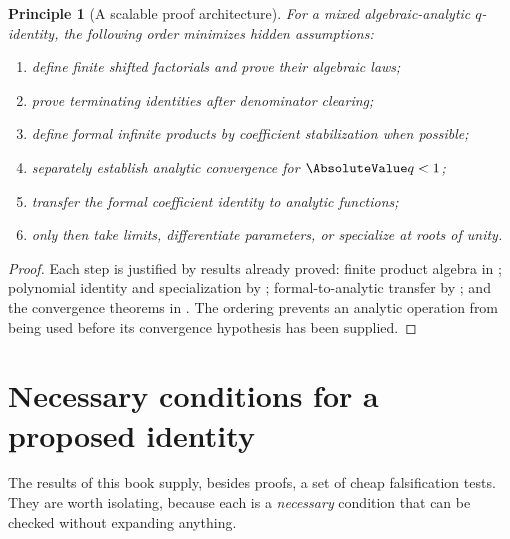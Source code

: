 \documentclass[11pt,a4paper,oneside,openany]{book}
\newtheorem{principle}[principle]{Principle}
\theoremstyle{definition}
\theoremstyle{remark}
\begin{document}
\begin{principle}[A scalable proof architecture]\label{prin:proof-architecture}
For a mixed algebraic-analytic $q$-identity, the following order minimizes hidden assumptions:
\begin{enumerate}
\item define finite shifted factorials and prove their algebraic laws;
\item prove terminating identities after denominator clearing;
\item define formal infinite products by coefficient stabilization when possible;
\item separately establish analytic convergence for $\AbsoluteValue q<1$;
\item transfer the formal coefficient identity to analytic functions;
\item only then take limits, differentiate parameters, or specialize at roots of unity.
\end{enumerate}
\end{principle}

\begin{proof}
Each step is justified by results already proved: finite product algebra in ; polynomial identity and specialization by ; formal-to-analytic transfer by ; and the convergence theorems in .  The ordering prevents an analytic operation from being used before its convergence hypothesis has been supplied.
\end{proof}

\section{Necessary conditions for a proposed identity}

The results of this book supply, besides proofs, a set of cheap falsification
tests.  They are worth isolating, because each is a \emph{necessary}
condition that can be checked without expanding anything.
\end{document}
